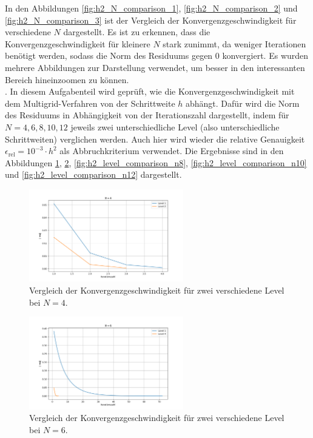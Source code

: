 \documentclass[11pt,a4paper]{article}
\begin{document}
\noindent In den Abbildungen \ref{fig:h2_N_comparison_1}, \ref{fig:h2_N_comparison_2} und \ref{fig:h2_N_comparison_3} ist der Vergleich der Konvergenzgeschwindigkeit für verschiedene $N$ dargestellt. Es ist zu erkennen, dass
die Konvergenzgeschwindigkeit für kleinere $N$ stark zunimmt, da weniger Iterationen benötigt werden, sodass die Norm des Residuums gegen $0$ konvergiert. Es wurden mehrere Abbildungen zur Darstellung verwendet, um besser in den interessanten
Bereich hineinzoomen zu können.\\

. In diesem Aufgabenteil wird geprüft, wie die Konvergenzgeschwindigkeit mit dem Multigrid-Verfahren von der Schrittweite $h$ abhängt. Dafür wird die Norm des Residuums in Abhängigkeit von der Iterationszahl dargestellt, indem für $N = 4,6,8,10,12$
jeweils zwei unterschiedliche Level (also unterschiedliche Schrittweiten) verglichen werden. Auch hier wird wieder die relative Genauigkeit $\epsilon_{\mathrm{rel}} = 10^{-3} \cdot h^2$ als Abbruchkriterium verwendet. Die Ergebnisse sind in den Abbildungen
\ref{fig:h2_level_comparison_n4}, \ref{fig:h2_level_comparison_n6}, \ref{fig:h2_level_comparison_n8}, \ref{fig:h2_level_comparison_n10} und \ref{fig:h2_level_comparison_n12} dargestellt.
\begin{figure}[htbp]
    \centering
    \includegraphics[width=0.6\textwidth,scale=0.7]{h2_level_comparison_n4}
    \caption[Vergleich der Konvergenzgeschwindigkeit für zwei verschiedene Level bei $N = 4$.]{Vergleich der Konvergenzgeschwindigkeit für zwei verschiedene Level bei $N = 4$.}\label{fig:h2_level_comparison_n4}
\end{figure}
\begin{figure}[htbp]
    \centering
    \includegraphics[width=0.6\textwidth,scale=0.7]{h2_level_comparison_n6}
    \caption[Vergleich der Konvergenzgeschwindigkeit für zwei verschiedene Level bei $N = 6$.]{Vergleich der Konvergenzgeschwindigkeit für zwei verschiedene Level bei $N = 6$.}\label{fig:h2_level_comparison_n6}
\end{figure}
\end{document}
